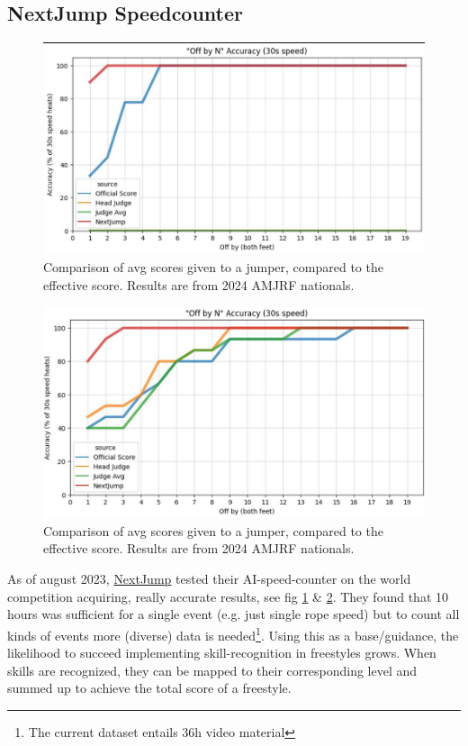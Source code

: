 \subsection{NextJump Speedcounter}
\label{subsubsec:bp-literature-nextjump-speedcounter}

\begin{figure}
    \centering
    \includegraphics[width=0.95\linewidth]{img/nextjump-off-by-feet}
    \caption[nextjump-results]{Comparison of avg scores given to a jumper, compared to the effective score. Results are from 2024 AMJRF nationals.}
    \label{fig:nextjump-results-off-by-feet}
\end{figure}

\begin{figure}
    \centering
    \includegraphics[width=0.95\linewidth]{img/nextjump-off-by-feet-judges}
    \caption[nextjump-results-multi]{Comparison of avg scores given to a jumper, compared to the effective score. Results are from 2024 AMJRF nationals.}
    \label{fig:nextjump-results-off-by-feet-judges-amjrf-2024}
\end{figure}

As of august 2023, \href{https://nextjump.app/}{NextJump} tested their AI-speed-counter on the world competition acquiring, really accurate results, see fig \ref{fig:nextjump-results-off-by-feet} \& \ref{fig:nextjump-results-off-by-feet-judges-amjrf-2024}. They found that 10 hours was sufficient for a single event (e.g. just single rope speed) but to count all kinds of events more (diverse) data is needed\footnote{The current dataset entails 36h video material}. Using this as a base/guidance, the likelihood to succeed implementing skill-recognition in freestyles grows.
When skills are recognized, they can be mapped to their corresponding level and summed up to achieve the total score of a freestyle.


